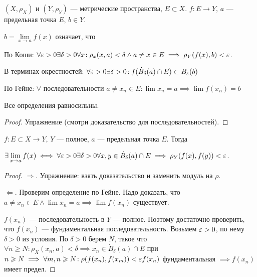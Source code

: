 \begin{definition}
    $(X, \rho_X)$ и  $(Y, \rho_Y)$ --- метрические пространства, $E \subset X$.  $f\!: E \to Y$,  $a$ --- предельная точка  $E$,  $b \in Y$.

     $b = \lim\limits_{x \to a} f(x)$ означает, что

     По Коши:  $\forall \varepsilon > 0 \exists \delta > 0 \forall x\!: \rho_x(x,a) < \delta \land a \neq x \in E \implies \rho_Y(f(x), b) < \varepsilon$.

     В терминах окрестностей: $\forall \varepsilon > 0 \exists \delta > 0\!: f(\dot{B}_{\delta}(a) \cap E) \subset B_\varepsilon(b)$

     По Гейне: $\forall$ последовательности  $a \neq x_n \in E\!: \lim x_n = a \implies \lim f(x_n) = b$
\end{definition}
\begin{theorem}
    Все определения равносильны. 
\end{theorem}
\begin{proof}
    Упражнение (смотри доказательство для последовательностей).
\end{proof}
\begin{theorem}
    $f\!:E \subset X \to Y$,  $Y$ --- полное,  $a$ --- предельная точка  $E$. Тогда

     $\exists \lim\limits_{x \to a} f(x) \iff \forall \varepsilon > 0 \exists \delta > 0 \forall x, y \in \dot{B}_{\delta}(a) \cap E \implies \rho_Y(f(x), f(y)) < \varepsilon$.
\end{theorem}
\begin{proof}
    $\Rightarrow$. Упражнение: взять доказательство и заменить модуль на  $\rho$.

     $\Leftarrow$. Проверим определение по Гейне. Надо доказать, что  $a \neq x_n \in E \land \lim x_n = a \implies \lim f(x_n)$ существует.

      $f(x_n)$ --- последовательность в  $Y$ --- полное. Поэтому достаточно проверить, что  $f(x_n)$ --- фундаментальная последовательность. Возьмем  $\varepsilon > 0$, по нему  $\delta > 0$ из условия. По  $\delta > 0$ берем  $N$, такое что  $\forall n \ge N\!: \rho_X(x_n, a) < \delta \implies x_n \in \dot{B}_\delta(a)\cap E$ при $n \geqslant N \implies \forall m, n \geqslant N\!: \rho(f(x_n), f(x_m)) < \varepsilon f(x_n)$ фундаментальная $\implies f(x_n)$ имеет предел.
\end{proof}

